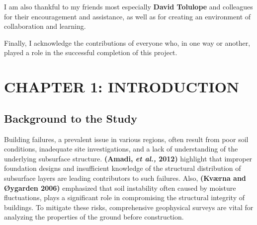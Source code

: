 \documentclass[12pt,a4paper]{report}
\begin{document}
I am also thankful to my friends most especially \textbf{David Tolulope} and colleagues for their encouragement and assistance, as well as for creating an environment of collaboration and learning.

Finally, I acknowledge the contributions of everyone who, in one way or another, played a role in the successful completion of this project.  

\listoffigures
{}

\listoftables
{}

\tableofcontents

\newpage


\chapter{CHAPTER 1: INTRODUCTION}

\section{Background to the Study}

Building failures, a prevalent issue in various regions, often result from poor soil conditions, inadequate site investigations, and a lack of understanding of the underlying subsurface structure. \textbf{(Amadi, \textit{et al.,} 2012)} highlight that improper foundation designs and insufficient knowledge of the structural distribution of subsurface layers are leading contributors to such failures. Also, \textbf{(Kværna and \textbf{Øygarden} 2006)} emphasized that soil instability often caused by moisture fluctuations, plays a significant role in compromising the structural integrity of buildings. To mitigate these risks, comprehensive geophysical surveys are vital for analyzing the properties of the ground before construction.
\end{document}
